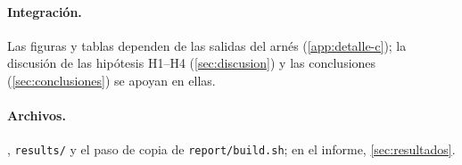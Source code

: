 \paragraph{Integración.} Las figuras y tablas dependen de las salidas del arnés
(\cref{app:detalle-c}); la discusión de las hipótesis H1--H4 (\cref{sec:discusion}) y las
conclusiones (\cref{sec:conclusiones}) se apoyan en ellas.

\paragraph{Archivos.} , \texttt{results/} y el paso de
copia de \texttt{report/build.sh}; en el informe, \cref{sec:resultados}.
